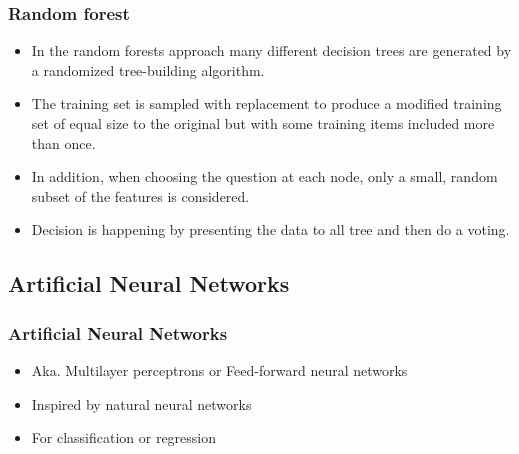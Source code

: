 \documentclass[aspectratio=169]{beamer}
\begin{document}
\begin{frame}
  \frametitle{Random forest}
  \begin{block}{}
    \begin{center}
      \begin{itemize}
      \item In the random forests approach many different decision
        trees are generated by a randomized tree-building algorithm.
      \item The training set is sampled with replacement to produce a
        modified training set of equal size to the original but with some
        training items included more than once.
      \item In addition, when choosing the question at each node, only a
        small, random subset of the features is considered.
      \item Decision is happening by presenting the data to all tree
        and then do a voting.
      \end{itemize}
    \end{center}
  \end{block}
\end{frame}

\subsection{Artificial Neural Networks}

\setcounter{tocdepth}{2}
\begin{frame}{}
   \tableofcontents[currentsubsection]
\end{frame}


\begin{frame}
  \begin{block}{}
    \begin{center}
      \frametitle{Artificial Neural Networks}
      \begin{itemize}
      \item Aka. Multilayer perceptrons or Feed-forward neural networks
      \item Inspired by natural neural networks
      \item For classification or regression
      \end{itemize}
    \end{center}  
  \end{block}  
\end{frame}
\end{document}
